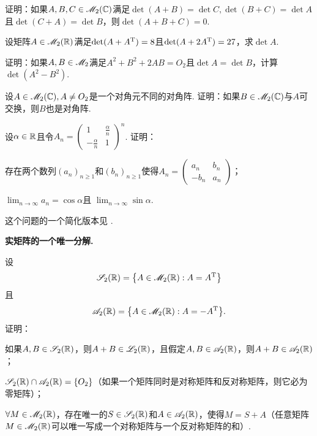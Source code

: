 \begin{problem}
  证明：如果$A,B,C\in\mathscr M_2(\mathbb C)$满足$\det(A+B)=\det C,\det(B+C)=\det A$且$\det(C+A)=\det B$，则$\det(A+B+C)=0$.
\end{problem}

\begin{problem}
  设矩阵$A\in\mathscr M_2(\mathbb R)$满足$\det(A+A^{\mathrm T})=8$且$\det(A+2A^{\mathrm T})=27$，求$\det A$.
\end{problem}

\begin{problem}
  证明：如果$A,B\in\mathscr M_2$满足$A^2+B^2+2AB=O_2$且$\det A=\det B$，计算$\det(A^2-B^2)$.
\end{problem}

\begin{problem}
  设$A\in\mathscr M_2(\mathbb C),A\ne O_2$是一个对角元不同的对角阵. 证明：如果$B\in\mathscr M_2(\mathbb C)$与$A$可交换，则$B$也是对角阵.
\end{problem}

\begin{problem}
  设$\alpha\in\mathbb R$且令$A_n=\begin{pmatrix}
    1 & \frac\alpha n\\
    -\frac\alpha n & 1
  \end{pmatrix}^n$. 证明：
  \begin{enum}
    \item 存在两个数列$(a_n)_{n\ge1}$和$(b_n)_{n\ge1}$使得$A_n=\begin{pmatrix}
          a_n & b_n \\
          -b_n & a_n
        \end{pmatrix}$；
    \item $\lim_{n\to\infty}a_n=\cos\alpha$且
        $\lim_{n\to\infty}\sin\alpha$.
  \end{enum}
\end{problem}
\begin{remark}
  这个问题的一个简化版本见 \cite[p.76]{18}.
\end{remark}

\begin{problem}
  {\bfseries 实矩阵的一个唯一分解.}

  设
  \[
    \mathscr S_2(\MR) = \left\{
      A\in\MM_2(\MR): A = A\TT
    \right\}
  \]
  且
  \[
    \mathscr A_2(\MR) = \left\{ A\in\MM_2(\MR):A=-A\TT \right\}.
  \]
  证明：
  \begin{enum}
    \item 如果$A,B\in\mathscr S_2(\mathbb R)$，则$A+B\in\mathscr L_2(\mathbb R)$，且假定$A,B\in\mathscr A_2(\mathbb R)$，则$A+B\in\mathscr A_2(\mathbb R)$；
    \item $\mathscr S_2(\mathbb R)\cap\mathscr A_2(\mathbb R)=\{O_2\}$（如果一个矩阵同时是对称矩阵和反对称矩阵，则它必为零矩阵）；
    \item $\forall M\in\mathscr M_2(\mathbb R)$，存在唯一的$S\in\mathscr S_2(\mathbb R)$和$A\in\mathscr A_2(\mathbb R)$，使得$M=S+A$（任意矩阵$M\in\mathscr M_2(\mathbb R)$可以唯一写成一个对称矩阵与一个反对称矩阵的和）.
  \end{enum}
\end{problem}

